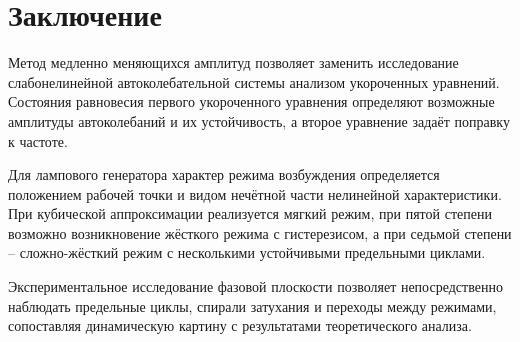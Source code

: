 \section{Заключение}

Метод медленно меняющихся амплитуд позволяет заменить исследование слабонелинейной автоколебательной системы анализом укороченных уравнений. Состояния равновесия первого укороченного уравнения определяют возможные амплитуды автоколебаний и их устойчивость, а второе уравнение задаёт поправку к частоте.

Для лампового генератора характер режима возбуждения определяется положением рабочей точки и видом нечётной части нелинейной характеристики. При кубической аппроксимации реализуется мягкий режим, при пятой степени возможно возникновение жёсткого режима с гистерезисом, а при седьмой степени -- сложно-жёсткий режим с несколькими устойчивыми предельными циклами.

Экспериментальное исследование фазовой плоскости позволяет непосредственно наблюдать предельные циклы, спирали затухания и переходы между режимами, сопоставляя динамическую картину с результатами теоретического анализа.
